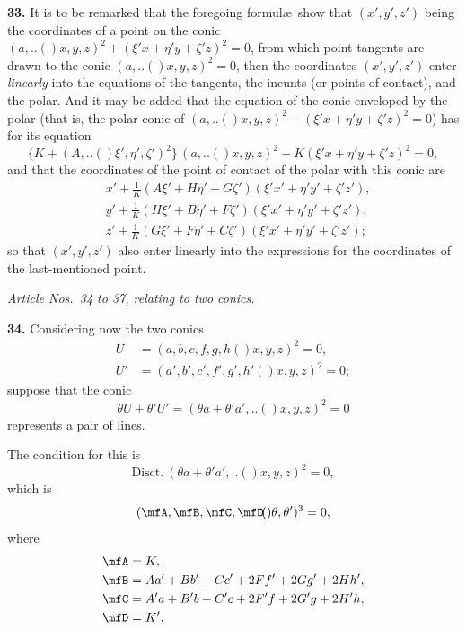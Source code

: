 \documentclass[11pt,a4paper]{book}
\providecommand{\qform}[1]{(#1)}
\begin{document}
\textbf{33.} It is to be remarked that the foregoing formul\ae\ show that $(x', y', z')$ being the coordinates of a point on the conic $(a,..\!\qform{}{x, y, z})^{2} + (\xi'x + \eta'y + \zeta'z)^{2} = 0$, from which point tangents are drawn to the conic $(a,..\!\qform{}{x, y, z})^{2} = 0$, then the coordinates $(x', y', z')$ enter \textit{linearly} into the equations of the tangents, the ineunts (or points of contact), and the polar. And it may be added that the equation of the conic enveloped by the polar (that is, the polar conic of $(a,..\!\qform{}{x, y, z})^{2} + (\xi'x + \eta'y + \zeta'z)^{2} = 0$) has for its equation
\[
\{K + (A,..\!\qform{}{\xi', \eta', \zeta'})^{2}\}\,(a,..\!\qform{}{x, y, z})^{2} - K(\xi'x + \eta'y + \zeta'z)^{2} = 0,
\]
and that the coordinates of the point of contact of the polar with this conic are
\begin{align*}
&x' + \frac{1}{K}(A\xi' + H\eta' + G\zeta')(\xi'x' + \eta'y' + \zeta'z'),\\
&y' + \frac{1}{K}(H\xi' + B\eta' + F\zeta')(\xi'x' + \eta'y' + \zeta'z'),\\
&z' + \frac{1}{K}(G\xi' + F\eta' + C\zeta')(\xi'x' + \eta'y' + \zeta'z');
\end{align*}
so that $(x', y', z')$ also enter linearly into the expressions for the coordinates of the last-mentioned point.

\medskip
\begin{center}
\textit{Article Nos.\ 34 to 37, relating to two conics.}
\end{center}
\medskip

\textbf{34.} Considering now the two conics
\begin{align*}
U &= (a, b, c, f, g, h \!\qform{}{x, y, z})^{2} = 0,\\
U' &= (a', b', c', f', g', h' \!\qform{}{x, y, z})^{2} = 0;
\end{align*}
suppose that the conic
\[
\theta U + \theta' U' = (\theta a + \theta' a',.. \!\qform{}{x, y, z})^{2} = 0
\]
represents a pair of lines.

The condition for this is
\[
\text{Disct.}\ (\theta a + \theta' a',.. \!\qform{}{x, y, z})^{2} = 0,
\]
which is
\[
(\mfA, \mfB, \mfC, \mfD \!\qform{}{\theta, \theta'})^{3} = 0,
\]
where
\begin{align*}
\mfA &= K,\\
\mfB &= Aa' + Bb' + Cc' + 2Ff' + 2Gg' + 2Hh',\\
\mfC &= A'a + B'b + C'c + 2F'f + 2G'g + 2H'h,\\
\mfD &= K'.
\end{align*}
\end{document}
